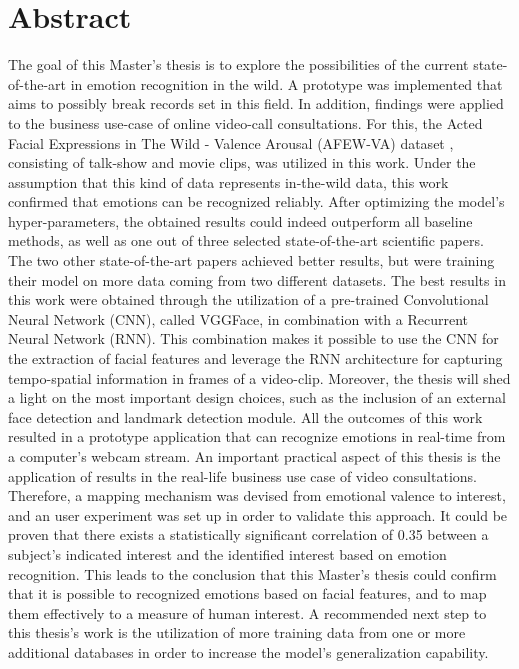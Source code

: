 \documentclass[11pt,a4paper]{scrbook}
\begin{document}
\begin{titlepage}
\end{titlepage}

\restoregeometry



\chapter{Abstract}
The goal of this Master's thesis is to explore the possibilities of the current state-of-the-art in emotion recognition in the wild. A prototype was implemented that aims to possibly break records set in this field. In addition, findings were applied to the business use-case of online video-call consultations.
\newline\newline
For this, the Acted Facial Expressions in The Wild - Valence Arousal (AFEW-VA) dataset \citep{Kossaifi:2017:AFEW-VADatabase}, consisting of talk-show and movie clips, was utilized in this work. Under the assumption that this kind of data represents in-the-wild data, this work confirmed that emotions can be recognized reliably. After optimizing the model's hyper-parameters, the obtained results could indeed outperform all baseline methods, as well as one out of three selected state-of-the-art scientific papers. The two other state-of-the-art papers achieved better results, but were training their model on more data coming from two different datasets.
\newline\newline
The best results in this work were obtained through the utilization of a pre-trained Convolutional Neural Network (CNN), called VGGFace, in combination with a Recurrent Neural Network (RNN). This combination makes it possible to use the CNN for the extraction of facial features and leverage the RNN architecture for capturing tempo-spatial information in frames of a video-clip. Moreover, the thesis will shed a light on the most important design choices, such as the inclusion of an external face detection and landmark detection module. All the outcomes of this work resulted in a prototype application that can recognize emotions in real-time from a computer's webcam stream.
\newline\newline
An important practical aspect of this thesis is the application of results in the real-life business use case of video consultations. Therefore, a mapping mechanism was devised from emotional valence to interest, and an user experiment was set up in order to validate this approach. It could be proven that there exists a statistically significant correlation of 0.35 between a subject's indicated interest and the identified interest based on emotion recognition. This leads to the conclusion that this Master's thesis could confirm that it is possible to recognized emotions based on facial features, and to map them effectively to a measure of human interest.
\newline\newline
A recommended next step to this thesis's work is the utilization of more training data from one or more additional databases in order to increase the model's generalization capability.
\end{document}
